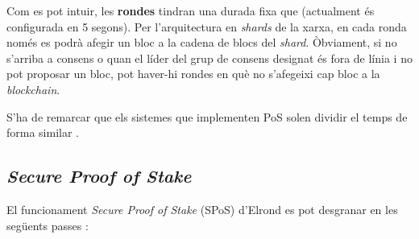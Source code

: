 \documentclass[11pt,a4paper]{article}
\begin{document}
Com es pot intuir, les \textbf{rondes} tindran una durada fixa que (actualment és configurada en 5 segons). Per l'arquitectura en \textit{shards} de la xarxa, en cada ronda només es podrà afegir un bloc a la cadena de blocs del \textit{shard}. Òbviament, si no s'arriba a consens o quan el líder del grup de consens designat és fora de línia i no pot proposar un bloc, pot haver-hi rondes en què no s'afegeixi cap bloc a la \textit{blockchain}.

S'ha de remarcar que els sistemes que implementen PoS solen dividir el temps de forma similar \cite{elrond2019}.

\subsection{\textit{Secure Proof of Stake}}
El funcionament \textit{Secure Proof of Stake} (SPoS) d'Elrond es pot desgranar en les següents passes \cite{elrond2022,elrond2019}: 
\end{document}
